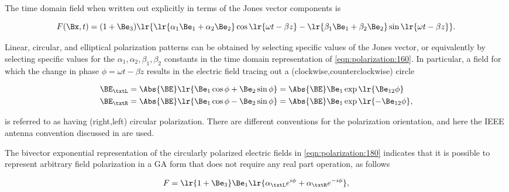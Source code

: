 The time domain field when written out explicitly in terms of the Jones vector components is

\begin{dmath}\label{eqn:polarization:160}
F(\Bx, t) = (1 + \Be_3) \lr{
\lr{ \alpha_1 \Be_1 + \alpha_2 \Be_2 } \cos\lr{ \omega t - \beta z }
-\lr{ \beta_1 \Be_1 + \beta_2 \Be_2 } \sin\lr{ \omega t - \beta z }
}.
\end{dmath}

Linear, circular, and elliptical polarization patterns can be obtained by selecting specific values of the Jones vector, or equivalently by selecting specific values for the \( \alpha_1, \alpha_2, \beta_1, \beta_2 \) constants in the time domain representation of \cref{eqn:polarization:160}.
In particular,
a field for which the
change in phase \( \phi = \omega t - \beta z \) results in the electric field tracing out a (clockwise,counterclockwise) circle

\begin{dmath}\label{eqn:polarization:180}
\begin{aligned}
\BE_\txtL &= \Abs{\BE} \lr{ \Be_1 \cos\phi + \Be_2 \sin\phi } = \Abs{\BE} \Be_1 \exp\lr{  \Be_{12} \phi } \\
\BE_\txtR &= \Abs{\BE} \lr{ \Be_1 \cos\phi - \Be_2 \sin\phi } = \Abs{\BE} \Be_1 \exp\lr{ -\Be_{12} \phi },
\end{aligned}
\end{dmath}

is referred to as having
(right,left) circular polarization.
There are different conventions for the polarization orientation, and here the IEEE antenna convention discussed in \citep{balanis1989advanced} are used.


The bivector exponential representation of the circularly polarized electric fields in \cref{eqn:polarization:180} indicates that it is possible to represent arbitrary field polarization in a GA form that does not require any real part operation, as follows

\begin{dmath}\label{eqn:polarization:200}
F = \lr{ 1 + \Be_3 } \Be_1 \lr{ \alpha_\txtL e^{i\phi} + \alpha_\txtR e^{-i\phi} },
\end{dmath}


